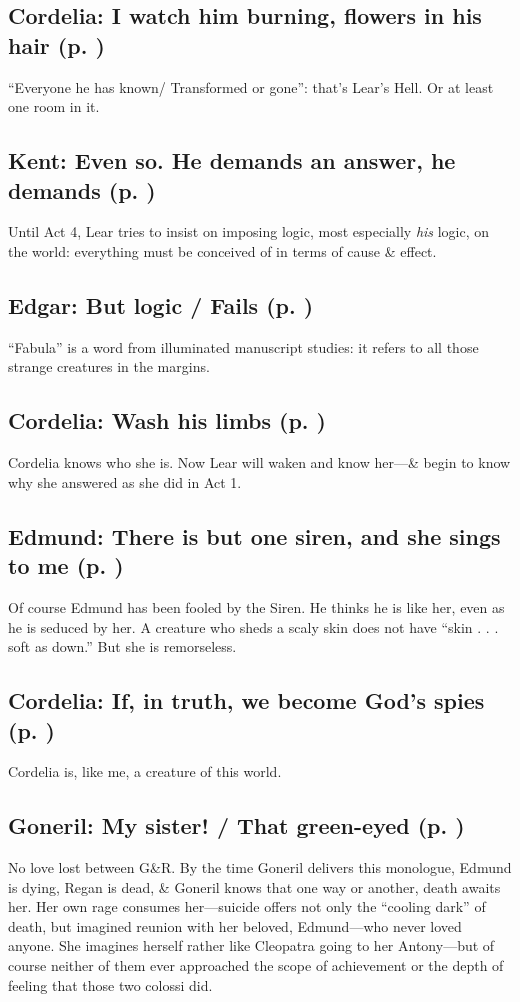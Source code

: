 \subsection{Cordelia: I watch him burning, flowers in his hair (p. \pageref{ch:lear_bg})}
``Everyone he has known/ Transformed or gone'': that's Lear's Hell. Or at least one room in it.

\subsection{Kent: Even so. He demands an answer, he demands (p. \pageref{ch:lear_bh})}
Until Act 4, Lear tries to insist on imposing logic, most especially \emph{his} logic, on the world: everything must be conceived of in terms of cause \& effect.

\subsection{Edgar: But logic / Fails (p. \pageref{ch:lear_bi})}
``Fabula'' is a word from illuminated manuscript studies: it refers to all those strange creatures in the margins.

\subsection{Cordelia: Wash his limbs (p. \pageref{ch:lear_bj})}

Cordelia knows who she is. Now Lear will waken and know her---\& begin to know why she answered as she did in Act 1.

\subsection{Edmund: There is but one siren, and she sings to me (p. \pageref{ch:lear_bk})}
Of course Edmund has been fooled by the Siren. He thinks he is like her, even as he is seduced by her. A creature who sheds a scaly skin does not have ``skin . . . soft as down.'' But she is remorseless.

\subsection{Cordelia: If, in truth, we become God's spies (p. \pageref{ch:lear_bl})}
Cordelia is, like me, a creature of this world.

\subsection{Goneril: My sister! / That green-eyed (p. \pageref{ch:lear_bm})}
No love lost between G\&R. By the time Goneril delivers this monologue, Edmund is dying, Regan is dead, \& Goneril knows that one way or another, death awaits her. Her own rage consumes her---suicide offers not only the ``cooling dark'' of death, but imagined reunion with her beloved, Edmund---who never loved anyone. She imagines herself rather like Cleopatra going to her Antony---but of course neither of them ever approached the scope of achievement or the depth of feeling that those two colossi did.

